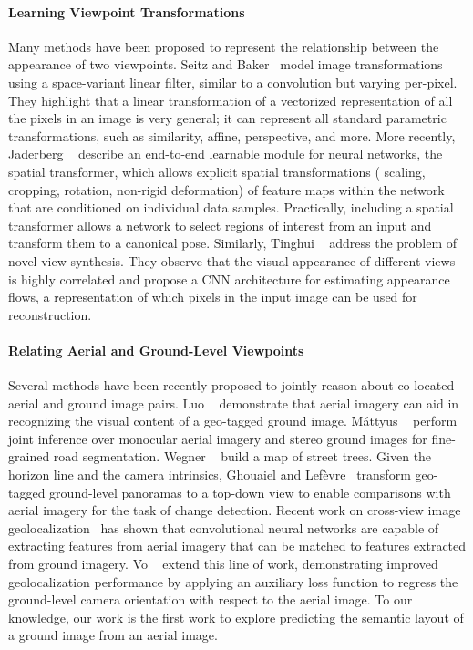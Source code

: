 \paragraph{Learning Viewpoint Transformations}
Many methods have been proposed to represent the relationship between
the appearance of two viewpoints. Seitz and Baker~\cite{filterflow}
model image transformations using a space-variant linear filter,
similar to a convolution but varying per-pixel. They highlight that a
linear transformation of a vectorized representation of all the pixels
in an image is very general; it can represent all standard parametric
transformations, such as similarity, affine, perspective, and more.
More recently, Jaderberg \etal~\cite{jaderberg2015spatial} describe an
end-to-end learnable module for neural networks, the spatial
transformer, which allows explicit spatial transformations (\eg
scaling, cropping, rotation, non-rigid deformation) of feature maps
within the network that are conditioned on individual data samples.
Practically, including a spatial transformer allows a network to
select regions of interest from an input and transform them to a
canonical pose. Similarly, Tinghui \etal~\cite{tinghui2016flow}
address the problem of novel view synthesis. They observe that the
visual appearance of different views is highly correlated and propose
a CNN architecture for estimating appearance flows, a representation
of which pixels in the input image can be used for reconstruction. 

\paragraph{Relating Aerial and Ground-Level Viewpoints}
Several methods have been recently proposed to jointly reason about
co-located aerial and ground image pairs. Luo
\etal~\cite{luo2008event} demonstrate that aerial imagery can aid
in recognizing the visual content of a geo-tagged ground image.
M{\'a}ttyus \etal~\cite{mattyus2016hd} perform joint inference over
monocular aerial imagery and stereo ground images for fine-grained
road segmentation. Wegner \etal~\cite{wegner2016cataloging} build a
map of street trees. Given the horizon line and the camera intrinsics,
Ghouaiel and Lef{\`e}vre~\cite{ghouaiel2016coupling} transform
geo-tagged ground-level panoramas to a top-down view to enable
comparisons with aerial imagery for the task of change detection.
Recent work on cross-view image
geolocalization~\cite{lin2013cross,lin2015learning,workman2015geocnn,workman2015wide}
 has shown that convolutional neural
networks are capable of extracting features from aerial imagery
that can be matched to features extracted from ground imagery.
Vo \etal~\cite{vo2016localizing} extend this line of work,
demonstrating improved geolocalization performance by applying an
auxiliary loss function to regress the ground-level camera orientation
with respect to the aerial image. To our knowledge, our work is the
first work to explore predicting the semantic layout of a ground
image from an aerial image.

